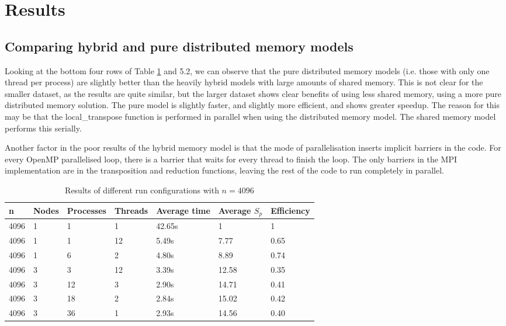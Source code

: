 \section{Results}

\subsection{Comparing hybrid and pure distributed memory models}

Looking at the bottom four rows of Table \ref{table1} and 5.2, we can
observe that the pure distributed memory models (i.e. those with only one thread
per process) are slightly better than the heavily hybrid models with large
amounts of shared memory. This is not clear for the smaller dataset, as the
results are quite similar, but the larger dataset shows clear benefits of using
less shared memory, using a more pure distributed memory solution. The pure
model is slightly faster, and slightly more efficient, and shows greater
speedup. The reason for this may be that the local\_transpose function is
performed in parallel when using the distributed memory model. The shared memory
model performs this serially.

Another factor in the poor results of the hybrid memory model is that the mode
of parallelisation inserts implicit barriers in the code. For every OpenMP
parallelised loop, there is a barrier that waits for every thread to finish the
loop. The only barriers in the MPI implementation are in the transposition and
reduction functions, leaving the rest of the code to run completely in parallel.

\begin{table}[h]
   \centering
    \begin{tabular}{| l | l | l | l | l | l | l |}
    \hline
    \bf{n} & \bf{Nodes} & \bf{Processes} &\bf{Threads} & \bf{Average time} & \bf{Average }$S_{p}$ & \bf{Efficiency} \\ \hline
	4096 & 1 & 1 & 1 & 42.65s & 1 & 1 \\ \hline
	4096 & 1 & 1 & 12 & 5.49s & 7.77 & 0.65  \\ \hline	
	4096 & 1 & 6 & 2 & 4.80s & 8.89 & 0.74 \\ \hline
	4096 & 3 & 3 & 12 & 3.39s & 12.58 & 0.35 \\ \hline
	4096 & 3 & 12 & 3 & 2.90s & 14.71 & 0.41 \\ \hline
	4096 & 3 & 18 & 2 & 2.84s & 15.02 & 0.42 \\ \hline	
	4096 & 3 & 36 & 1 & 2.93s & 14.56 & 0.40 \\ \hline
    \end{tabular}
	\label{table1}
  \caption{Results of different run configurations with $n = 4096$}
\end{table}

